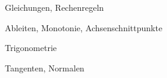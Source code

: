 



\begin{inhalt}
  \item Gleichungen, Rechenregeln
  \item Ableiten, Monotonie, Achsenschnittpunkte
	\item Trigonometrie
	\item Tangenten, Normalen
\end{inhalt}





